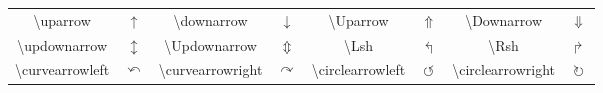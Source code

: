 \begin{tabular}{cc|cc|cc|cc}
    \textbackslash\textsf{uparrow} & $\uparrow$ & \textbackslash\textsf{downarrow} & $\downarrow$ & \textbackslash\textsf{Uparrow} & $\Uparrow$ & \textbackslash\textsf{Downarrow} & $\Downarrow$ \\
    \textbackslash\textsf{updownarrow} & $\updownarrow$ & \textbackslash\textsf{Updownarrow} & $\Updownarrow$ & \textbackslash\textsf{Lsh} & $\Lsh$ & \textbackslash\textsf{Rsh} & $\Rsh$ \\
    \textbackslash\textsf{curvearrowleft} & $\curvearrowleft$ & \textbackslash\textsf{curvearrowright} & $\curvearrowright$ & \textbackslash\textsf{circlearrowleft} & $\circlearrowleft$ & \textbackslash\textsf{circlearrowright} & $\circlearrowright$ \\ \hline
\end{tabular}
